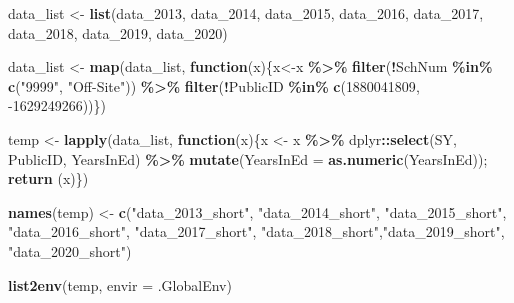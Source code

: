 \documentclass[
]{article}
\newenvironment{Shaded}{\begin{snugshade}}{\end{snugshade}}
\newcommand{\ControlFlowTok}[1]{\textcolor[rgb]{0.13,0.29,0.53}{\textbf{#1}}}
\newcommand{\DataTypeTok}[1]{\textcolor[rgb]{0.13,0.29,0.53}{#1}}
\newcommand{\DecValTok}[1]{\textcolor[rgb]{0.00,0.00,0.81}{#1}}
\newcommand{\KeywordTok}[1]{\textcolor[rgb]{0.13,0.29,0.53}{\textbf{#1}}}
\newcommand{\NormalTok}[1]{#1}
\newcommand{\OperatorTok}[1]{\textcolor[rgb]{0.81,0.36,0.00}{\textbf{#1}}}
\newcommand{\StringTok}[1]{\textcolor[rgb]{0.31,0.60,0.02}{#1}}
\begin{document}
\begin{Shaded}
\begin{Highlighting}[]
\NormalTok{data\_list \textless{}{-}}\StringTok{ }\KeywordTok{list}\NormalTok{(data\_}\DecValTok{2013}\NormalTok{, data\_}\DecValTok{2014}\NormalTok{, data\_}\DecValTok{2015}\NormalTok{, data\_}\DecValTok{2016}\NormalTok{, data\_}\DecValTok{2017}\NormalTok{, data\_}\DecValTok{2018}\NormalTok{, data\_}\DecValTok{2019}\NormalTok{, data\_}\DecValTok{2020}\NormalTok{)}
\end{Highlighting}
\end{Shaded}

\begin{Shaded}
\begin{Highlighting}[]
\NormalTok{data\_list \textless{}{-}}\StringTok{ }\KeywordTok{map}\NormalTok{(data\_list, }\ControlFlowTok{function}\NormalTok{(x)\{x\textless{}{-}x }\OperatorTok{\%\textgreater{}\%}\StringTok{ }\KeywordTok{filter}\NormalTok{(}\OperatorTok{!}\NormalTok{SchNum }\OperatorTok{\%in\%}\StringTok{ }\KeywordTok{c}\NormalTok{(}\StringTok{"9999"}\NormalTok{, }\StringTok{"Off{-}Site"}\NormalTok{)) }\OperatorTok{\%\textgreater{}\%}\StringTok{ }\KeywordTok{filter}\NormalTok{(}\OperatorTok{!}\NormalTok{PublicID }\OperatorTok{\%in\%}\StringTok{ }\KeywordTok{c}\NormalTok{(}\DecValTok{1880041809}\NormalTok{, }\DecValTok{{-}1629249266}\NormalTok{))\})}

\NormalTok{temp \textless{}{-}}\StringTok{ }\KeywordTok{lapply}\NormalTok{(data\_list, }\ControlFlowTok{function}\NormalTok{(x)\{x \textless{}{-}}\StringTok{ }\NormalTok{x }\OperatorTok{\%\textgreater{}\%}\StringTok{ }\NormalTok{dplyr}\OperatorTok{::}\KeywordTok{select}\NormalTok{(SY, PublicID, YearsInEd) }\OperatorTok{\%\textgreater{}\%}\StringTok{ }\KeywordTok{mutate}\NormalTok{(}\DataTypeTok{YearsInEd =} \KeywordTok{as.numeric}\NormalTok{(YearsInEd)); }\KeywordTok{return}\NormalTok{ (x)\})}

\KeywordTok{names}\NormalTok{(temp) \textless{}{-}}\StringTok{ }\KeywordTok{c}\NormalTok{(}\StringTok{"data\_2013\_short"}\NormalTok{, }\StringTok{"data\_2014\_short"}\NormalTok{, }\StringTok{"data\_2015\_short"}\NormalTok{, }\StringTok{"data\_2016\_short"}\NormalTok{, }\StringTok{"data\_2017\_short"}\NormalTok{, }\StringTok{"data\_2018\_short"}\NormalTok{,}\StringTok{"data\_2019\_short"}\NormalTok{, }\StringTok{"data\_2020\_short"}\NormalTok{)}

\KeywordTok{list2env}\NormalTok{(temp, }\DataTypeTok{envir =}\NormalTok{ .GlobalEnv)}
\end{Highlighting}
\end{Shaded}
\end{document}
